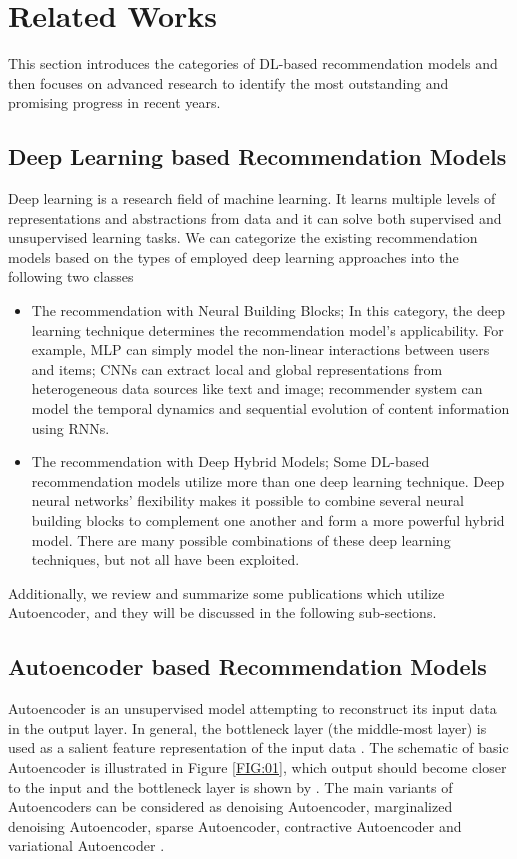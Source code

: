 \documentclass[a4paper,fleqn]{cas-dc}
\begin{document}
\section{Related Works}
\label{relatedworks}
This section introduces the categories of DL-based recommendation models and then focuses on advanced research to identify the most outstanding and promising progress in recent years.

\subsection{Deep Learning based Recommendation Models}
Deep learning is a research field of machine learning. It learns multiple levels of representations and abstractions from data and it can solve both supervised and unsupervised learning tasks. We can categorize the existing recommendation models based on the types of employed deep learning approaches into the following two classes \citep{29zhang2019a}

\begin{itemize}

	\item The recommendation with Neural Building Blocks; In this category, the deep learning technique determines the recommendation model's applicability. For example, MLP can simply model the non-linear interactions between users and items; CNNs can extract local and global representations from heterogeneous data sources like text and image; recommender system can model the temporal dynamics and sequential evolution of content information using RNNs.
	\item The recommendation with Deep Hybrid Models; Some DL-based recommendation models utilize more than one deep learning technique. Deep neural networks' flexibility makes it possible to combine several neural building blocks to complement one another and form a more powerful hybrid model. There are many possible combinations of these deep learning techniques, but not all have been exploited.
\end{itemize}

Additionally, we review and summarize some publications which utilize Autoencoder, and they will be discussed in the following sub-sections.


\subsection{Autoencoder based Recommendation Models}
Autoencoder is an unsupervised model attempting to reconstruct its input data in the output layer. In general, the bottleneck layer (the middle-most layer) is used as a salient feature representation of the input data \citep{29zhang2019a}. The schematic of basic Autoencoder is illustrated in Figure \ref{FIG:01}, which output  should become closer to the input  and the bottleneck layer is shown by . The main variants of Autoencoders can be considered as denoising Autoencoder, marginalized denoising Autoencoder, sparse Autoencoder, contractive Autoencoder and variational Autoencoder \citep{50goodfellow2016a}.
\end{document}
